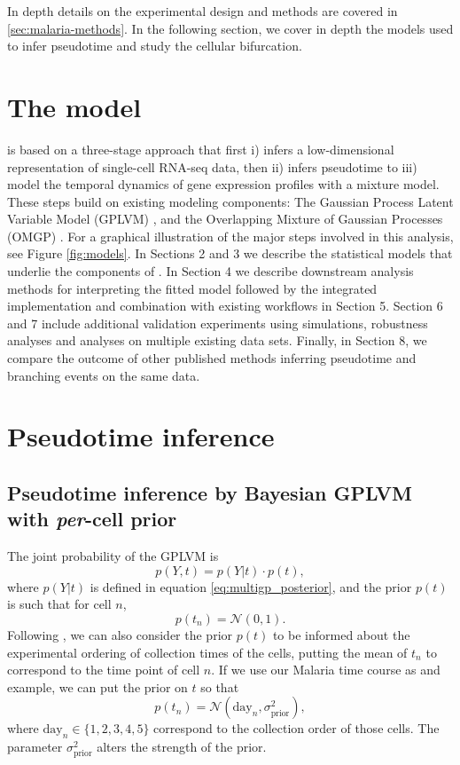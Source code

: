 In depth details on the experimental design and methods are covered in \ref{sec:malaria-methods}. In the following section, we cover in depth the models used to infer pseudotime and study the cellular bifurcation.

\section{The  model}

 is based on a three-stage approach that first i) infers a low-dimensional representation of single-cell RNA-seq data, then ii) infers pseudotime to iii) model the temporal dynamics of gene expression profiles with a mixture model. These steps build on existing modeling components: The Gaussian Process Latent Variable Model (GPLVM) \cite{Lawrence2006-it}, and the Overlapping Mixture of Gaussian Processes (OMGP) \cite{Lazaro-Gredilla2012-ta}. For a graphical illustration of the major steps involved in this analysis, see Figure \ref{fig:models}. In Sections 2 and 3 we describe the statistical models that underlie the components of . In Section 4 we describe downstream analysis methods for interpreting the fitted model followed by the integrated implementation and combination with existing workflows in Section 5. Section 6 and 7 include additional validation experiments using simulations, robustness analyses and analyses on multiple existing data sets. Finally, in Section 8, we compare the outcome of other published methods inferring pseudotime and branching events on the same data.

\section{Pseudotime inference}

\subsection{Pseudotime inference by Bayesian GPLVM with \textit{per}-cell prior}

The joint probability of the GPLVM is
\[ p(Y, t) = p(Y | t) \cdot p(t), \]
where $ p(Y | t) $ is defined in equation \ref{eq:multigp_posterior}, and the prior $ p(t) $ is such that for cell $ n $,
\[ p(t_n) = \mathcal{N}(0, 1). \]
Following \cite{Reid2016-ww}, we can also consider the prior $ p(t) $ to be informed about the experimental ordering of collection times of the cells, putting the mean of $ t_n $ to correspond to the time point of cell $ n $. If we use our Malaria time course as and example, we can put the prior on $ t $ so that
$$ p(t_n) = \mathcal{N}(\text{day}_n, \sigma_\text{prior}^2), $$
where $ \text{day}_n \in \{1, 2, 3, 4, 5 \} $ correspond to the collection order of those cells. The parameter $ \sigma_\text{prior}^2 $ alters the strength of the prior.

